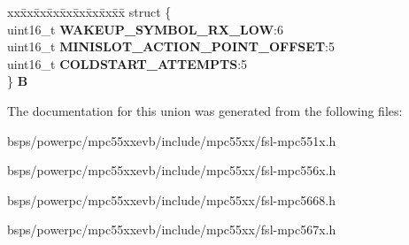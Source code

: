\begin{DoxyCompactItemize}
\begin{tabbing}
\end{tabbing}\item 
\mbox{\label{unionuPCR3_ad85b79501f33394b2fc3013e8ace05d2}} 
\begin{tabbing}
xx\=xx\=xx\=xx\=xx\=xx\=xx\=xx\=xx\=\kill
struct \{\\
\>uint16\_t {\bfseries WAKEUP\_SYMBOL\_RX\_LOW}:6\\
\>uint16\_t {\bfseries MINISLOT\_ACTION\_POINT\_OFFSET}:5\\
\>uint16\_t {\bfseries COLDSTART\_ATTEMPTS}:5\\
\} {\bfseries B}\\

\end{tabbing}\end{DoxyCompactItemize}


The documentation for this union was generated from the following files\+:\begin{DoxyCompactItemize}
\item 
bsps/powerpc/mpc55xxevb/include/mpc55xx/fsl-\/mpc551x.\+h\item 
bsps/powerpc/mpc55xxevb/include/mpc55xx/fsl-\/mpc556x.\+h\item 
bsps/powerpc/mpc55xxevb/include/mpc55xx/fsl-\/mpc5668.\+h\item 
bsps/powerpc/mpc55xxevb/include/mpc55xx/fsl-\/mpc567x.\+h\end{DoxyCompactItemize}
